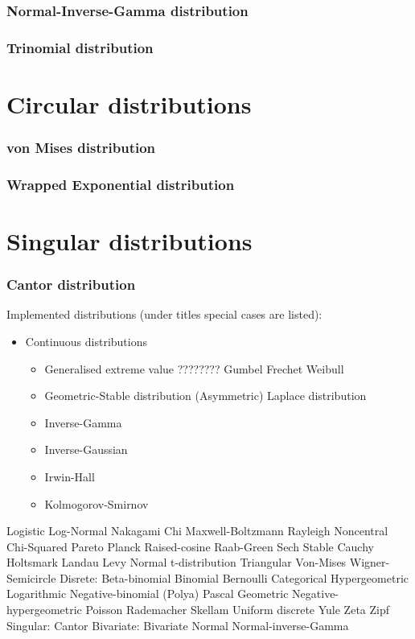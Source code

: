 \documentclass[a4paper,11pt]{article}
\theoremstyle{plain}
\theoremstyle{definition}
\begin{document}
	\section{Normal-Inverse-Gamma distribution}
	\section{Trinomial distribution}
	
	\pagebreak
	\part{Circular distributions}
	\section{von Mises distribution}
	\section{Wrapped Exponential distribution}
	
	\pagebreak
	\part{Singular distributions}
	\section{Cantor distribution}
	
	Implemented distributions (under titles special cases are listed):
	\begin{itemize}
		\item Continuous distributions
		\begin{itemize}
			\item Generalised extreme value ????????
				\subitem Gumbel
				\subitem Frechet
				\subitem Weibull
			\item Geometric-Stable distribution
				\subitem (Asymmetric) Laplace distribution
			\item Inverse-Gamma
			\item Inverse-Gaussian
			\item Irwin-Hall
			\item Kolmogorov-Smirnov
		\end{itemize}
	\end{itemize}
	
	Logistic
	Log-Normal
	Nakagami
	Chi
	Maxwell-Boltzmann
	Rayleigh
	Noncentral Chi-Squared
	Pareto
	Planck
	Raised-cosine
	Raab-Green
	Sech
	Stable
	Cauchy
	Holtsmark
	Landau
	Levy
	Normal
	t-distribution
	Triangular
	Von-Mises
	Wigner-Semicircle
	Disrete:
	Beta-binomial
	Binomial
	Bernoulli
	Categorical
	Hypergeometric
	Logarithmic
	Negative-binomial (Polya)
	Pascal
	Geometric
	Negative-hypergeometric
	Poisson
	Rademacher
	Skellam
	Uniform discrete
	Yule
	Zeta
	Zipf
	Singular:
	Cantor
	Bivariate:
	Bivariate Normal
	Normal-inverse-Gamma
\end{document}
